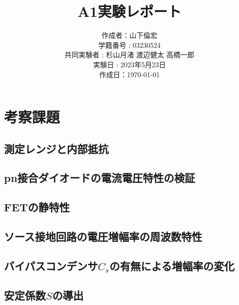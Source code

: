 \documentclass[11pt,a4paper]{ltjsarticle}
\title{A1実験レポート}
\date{}
\author{作成者：山下倫宏
\\学籍番号 : 03230524
\\ 共同実験者 : 杉山月渚 渡辺健太 高橋一郎
\\ 実験日 : 2023年5月23日
\\ 作成日：\today}
\begin{document}
\maketitle

\section{考察課題}
\subsection{測定レンジと内部抵抗}

\subsection{pn接合ダイオードの電流電圧特性の検証}

\subsection{FETの静特性}

\subsection{ソース接地回路の電圧増幅率の周波数特性}

\subsection{バイパスコンデンサ$C_{s}$の有無による増幅率の変化}

\subsection{安定係数$S$の導出}





\end{document}
